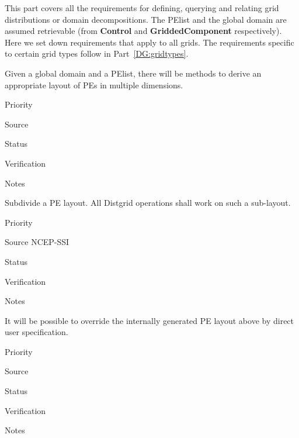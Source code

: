 
This part covers all the requirements for defining, querying and
relating grid distributions or domain decompositions. The PElist and
the global domain are assumed retrievable (from \textbf{Control} and
\textbf{GriddedComponent} respectively). Here we set down requirements
that apply to all grids. The requirements specific to certain grid
types follow in Part~\ref{DG:gridtypes}.



Given a global domain and a PElist, there will be methods to derive an
appropriate layout of PEs in multiple dimensions.

\begin{reqlist}
\item[Priority]
\item[Source]
\item[Status]
\item[Verification]
\item[Notes]
\end{reqlist}


Subdivide a PE layout.  All Distgrid operations shall work on such a sub-layout.

\begin{reqlist}
\item[Priority]
\item[Source] NCEP-SSI \\
\item[Status]
\item[Verification]
\item[Notes]
\end{reqlist}


It will be possible to override the internally generated PE layout above
by direct user specification.

\begin{reqlist}
\item[Priority]
\item[Source]
\item[Status]
\item[Verification]
\item[Notes]
\end{reqlist}


